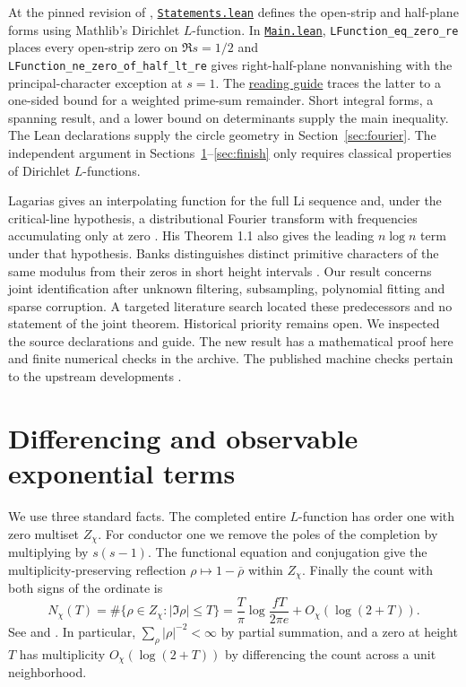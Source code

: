 \documentclass[11pt]{article}
\newcommand{\repourl}{https://github.com/lsernau/grh-lean/blob/72fead102f663d5c7a407964a13dc0cf9d977207/grh}
\begin{document}
At the pinned revision of \cite{repo}, \href{\repourl/src/Statements.lean}{\texttt{Statements.lean}} defines the open-strip and half-plane forms using Mathlib's Dirichlet $L$-function. In \href{\repourl/src/Main.lean}{\texttt{Main.lean}}, \texttt{LFunction\_eq\_zero\_re} places every open-strip zero on $\Re s=1/2$ and \texttt{LFunction\_ne\_zero\_of\_half\_lt\_re} gives right-half-plane nonvanishing with the principal-character exception at $s=1$. The \href{\repourl/GUIDE.md}{reading guide} traces the latter to a one-sided bound for a weighted prime-sum remainder. Short integral forms, a spanning result, and a lower bound on determinants supply the main inequality. The Lean declarations supply the circle geometry in Section~\ref{sec:fourier}. The independent argument in Sections~\ref{sec:diff}--\ref{sec:finish} only requires classical properties of Dirichlet $L$-functions.

Lagarias gives an interpolating function for the full Li sequence and, under the critical-line hypothesis, a distributional Fourier transform with frequencies accumulating only at zero \cite[Theorem 7.1]{lagarias}. His Theorem 1.1 also gives the leading $n\log n$ term under that hypothesis. Banks distinguishes distinct primitive characters of the same modulus from their zeros in short height intervals \cite{banks}. Our result concerns joint identification after unknown filtering, subsampling, polynomial fitting and sparse corruption. A targeted literature search located these predecessors and no statement of the joint theorem. Historical priority remains open. We inspected the source declarations and guide. The new result has a mathematical proof here and finite numerical checks in the archive. The published machine checks pertain to the upstream developments \cite{repo,lean}.

\section{Differencing and observable exponential terms}\label{sec:diff}
We use three standard facts. The completed entire $L$-function has order one with zero multiset $Z_\chi$. For conductor one we remove the poles of the completion by multiplying by $s(s-1)$. The functional equation and conjugation give the multiplicity-preserving reflection $\rho\mapsto 1-\overline\rho$ within $Z_\chi$. Finally the count with both signs of the ordinate is
\begin{equation}
 N_\chi(T)=\#\{\rho\in Z_\chi:|\Im\rho|\le T\}
 =\frac{T}{\pi}\log\frac{fT}{2\pi e}+O_\chi(\log(2+T)). \label{eq:rv}
\end{equation}
See \cite[Theorem 2.1]{lagarias} and \cite{bennett}. In particular, $\sum_\rho|\rho|^{-2}<\infty$ by partial summation, and a zero at height $T$ has multiplicity $O_\chi(\log(2+T))$ by differencing the count across a unit neighborhood.
\end{document}
